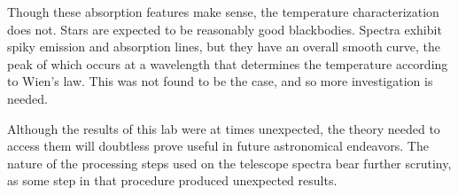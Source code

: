 \documentclass[a4paper,12pt]{article}
\begin{document}
Though these absorption features make sense, the temperature characterization does not. Stars are expected to be reasonably good blackbodies. Spectra exhibit spiky emission and absorption lines, but they have an overall smooth curve, the peak of which occurs at a wavelength that determines the temperature according to Wien’s law. This was not found to be the case, and so more investigation is needed.

Although the results of this lab were at times unexpected, the theory needed to access them will doubtless prove useful in future astronomical endeavors. The nature of the processing steps used on the telescope spectra bear further scrutiny, as some step in that procedure produced unexpected results.



\end{document}
